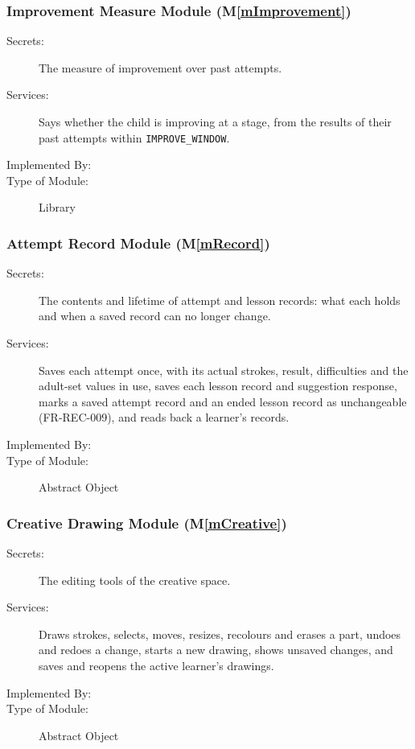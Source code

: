 \documentclass[12pt, titlepage]{article}
\newcommand{\mref}[1]{M\ref{#1}}
\begin{document}
\subsubsection{Improvement Measure Module (\mref{mImprovement})}

\begin{description}
\item[Secrets:] The measure of improvement over past attempts.
\item[Services:] Says whether the child is improving at a stage, from the
  results of their past attempts within \texttt{IMPROVE\_WINDOW}.
\item[Implemented By:] \progname{}
\item[Type of Module:] Library
\end{description}

\subsubsection{Attempt Record Module (\mref{mRecord})}

\begin{description}
\item[Secrets:] The contents and lifetime of attempt and lesson records: what
  each holds and when a saved record can no longer change.
\item[Services:] Saves each attempt once, with its actual strokes, result,
  difficulties and the adult-set values in use, saves each lesson record and
  suggestion response, marks a saved attempt record and an ended lesson record
  as unchangeable (FR-REC-009), and reads back a learner's records.
\item[Implemented By:] \progname{}
\item[Type of Module:] Abstract Object
\end{description}

\subsubsection{Creative Drawing Module (\mref{mCreative})}

\begin{description}
\item[Secrets:] The editing tools of the creative space.
\item[Services:] Draws strokes, selects, moves, resizes, recolours and erases a
  part, undoes and redoes a change, starts a new drawing, shows unsaved changes,
  and saves and reopens the active learner's drawings.
\item[Implemented By:] \progname{}
\item[Type of Module:] Abstract Object
\end{description}
\end{document}
